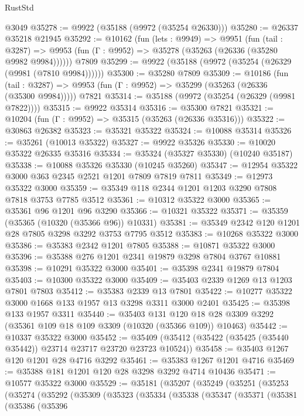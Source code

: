 \begin{lexlean}{RustStd}
\begin{coremodule}
    @3049
@35278 := @9922 (@35188 (@9972 (@35254 @26330)))
@35280 := @26337 @35218 @21945
@35292 := @10162
    (fun (lets : @9949) =>
    @9951
      (fun (tail : @3287) =>
      @9953 (fun (Γ : @9952) => @35278 (@35263 (@26336 (@35280 @9982 @9984))))))
    @7809
@35299 := @9922 (@35188 (@9972 (@35254 (@26329 (@9981 (@7810 @9984))))))
@35300 := @35280 @7809
@35309 := @10186
    (fun (tail : @3287) => @9953 (fun (Γ : @9952) => @35299 (@35263 (@26336 (@35300 @9984)))))
    @7821
@35314 := @35188 (@9972 (@35254 (@26329 (@9981 @7822))))
@35315 := @9922 @35314
@35316 := @35300 @7821
@35321 := @10204 (fun (Γ : @9952) => @35315 (@35263 (@26336 @35316)))
@35322 := @30863 @26382
@35323 := @35321 @35322
@35324 := @10088 @35314
@35326 := @35261 (@10013 @35322)
@35327 := @9922 @35326
@35330 := @10020 @35322 @26335 @35316
@35334 := @35324 (@35327 @35330) (@10240 @35187)
@35338 := @10088 @35326 @35330 (@10245 @35260)
@35347 := @12954 @35322 @3000 @363 @2345 @2521 @1201 @7809 @7819 @7811
@35349 := @12973 @35322 @3000
@35359 := @35349 @118 @2344 @1201 @1203 @3290 @7808 @7818 @3753 @7785 @3512
@35361 := @10312 @35322 @3000
@35365 := @35361 @96 @1201 @96 @3290
@35366 := @10321 @35322
@35371 := @35359 (@35365 (@10320 (@35366 @96)) @10331)
@35381 := @35349 @2342 @120 @1201 @28 @7805 @3298 @3292 @3753 @7795 @3512
@35383 := @10268 @35322 @3000
@35386 := @35383 @2342 @1201 @7805
@35388 := @10871 @35322 @3000
@35396 := @35388 @276 @1201 @2341 @19879 @3298 @7804 @3767 @10881
@35398 := @10291 @35322 @3000
@35401 := @35398 @2341 @19879 @7804
@35403 := @10300 @35322 @3000
@35409 := @35403 @2339 @1269 @13 @1203 @7801 @7803
@35412 := @35383 @2339 @13 @7801
@35422 := @10277 @35322 @3000 @1668 @133 @1957 @13 @3298 @3311 @3000 @2401
@35425 := @35398 @133 @1957 @3311
@35440 := @35403
    @131
    @120
    @18
    @28
    @3309
    @3292
    (@35361 @109 @18 @109 @3309 (@10320 (@35366 @109)) @10463)
@35442 := @10337 @35322 @3000
@35452 := @35409 (@35412 (@35422 (@35425 (@35440 @35442)) @23714 @23717 @23720 @23723 @10524))
@35458 := @35403 @1267 @120 @1201 @28 @4716 @3292
@35461 := @35383 @1267 @1201 @4716
@35469 := @35388 @181 @1201 @120 @28 @3298 @3292 @4714 @10436
@35471 := @10577 @35322 @3000
@35529 := @35181
    (@35207
      (@35249
        (@35251
          (@35253
            (@35274
              (@35292
                (@35309
                  (@35323
                    (@35334
                      (@35338
                        (@35347
                          (@35371
                            (@35381
                              (@35386
                                (@35396

\end{coremodule}
\end{lexlean}
